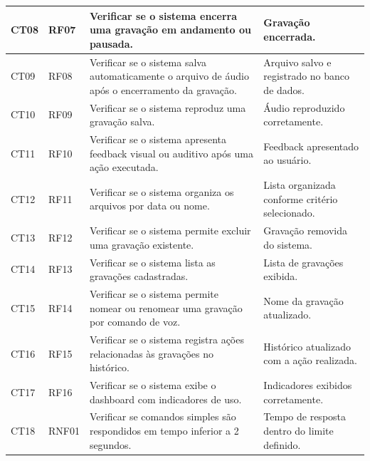 \documentclass[12pt,oneside,a4paper,brazil,final]{abntex2}
\begin{document}
\begin{longtable}{|p{1.5cm}|p{2.4cm}|p{5.8cm}|p{4.7cm}|}
\hline

CT08 & RF07 & Verificar se o sistema encerra uma gravação em andamento ou pausada. & Gravação encerrada. \\

\hline

CT09 & RF08 & Verificar se o sistema salva automaticamente o arquivo de áudio após o encerramento da gravação. & Arquivo salvo e registrado no banco de dados. \\

\hline

CT10 & RF09 & Verificar se o sistema reproduz uma gravação salva. & Áudio reproduzido corretamente. \\

\hline

CT11 & RF10 & Verificar se o sistema apresenta feedback visual ou auditivo após uma ação executada. & Feedback apresentado ao usuário. \\

\hline

CT12 & RF11 & Verificar se o sistema organiza os arquivos por data ou nome. & Lista organizada conforme critério selecionado. \\

\hline

CT13 & RF12 & Verificar se o sistema permite excluir uma gravação existente. & Gravação removida do sistema. \\

\hline

CT14 & RF13 & Verificar se o sistema lista as gravações cadastradas. & Lista de gravações exibida. \\

\hline

CT15 & RF14 & Verificar se o sistema permite nomear ou renomear uma gravação por comando de voz. & Nome da gravação atualizado. \\

\hline

CT16 & RF15 & Verificar se o sistema registra ações relacionadas às gravações no histórico. & Histórico atualizado com a ação realizada. \\

\hline

CT17 & RF16 & Verificar se o sistema exibe o dashboard com indicadores de uso. & Indicadores exibidos corretamente. \\

\hline

CT18 & RNF01 & Verificar se comandos simples são respondidos em tempo inferior a 2 segundos. & Tempo de resposta dentro do limite definido. \\


\end{longtable}
\end{document}

